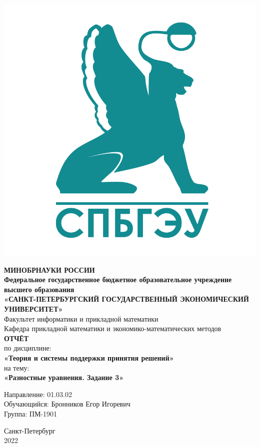 \documentclass[14pt,fleqn]{extarticle}
\begin{document}
	\begin{titlepage}
		\includegraphics[scale=0.12]{logo}
		\begin{center}
			\textbf{МИНОБРНАУКИ РОССИИ}\\
			\vspace{0.2cm}
			\textbf{Федеральное государственное бюджетное образовательное учреждение высшего образования}\\
			\textbf{«САНКТ-ПЕТЕРБУРГСКИЙ ГОСУДАРСТВЕННЫЙ ЭКОНОМИЧЕСКИЙ УНИВЕРСИТЕТ»}\\
			\vspace{0.6cm}
			Факультет информатики и прикладной математики\\
			Кафедра прикладной математики и экономико-математических методов\\
			\vspace{1cm}
			\textbf{ОТЧЁТ}\\
			по дисциплине:\\
			\textbf{«Теория и системы поддержки принятия решений»}\\
			на тему:\\
			\textbf{«Разностные уравнения. Задание 3»}\\
		\end{center}
		\vspace{1cm}
		Направление: 01.03.02\\
		Обучающийся: Бронников Егор Игоревич\\
		Группа: ПМ-1901\\
		\vfill
		\begin{center}
			Санкт-Петербург\\
			2022\\
		\end{center}
	\end{titlepage}
\end{document}
